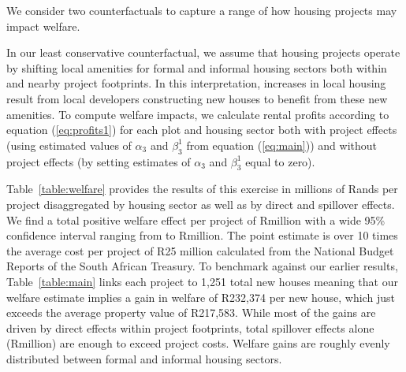\documentclass[12pt]{article}
\begin{document}
We consider two counterfactuals to capture a range of how housing projects may impact welfare.  

In our least conservative counterfactual, we assume that housing projects operate by shifting local amenities for formal and informal housing sectors both within and nearby project footprints.  In this interpretation, increases in local housing result from local developers constructing new houses to benefit from these new amenities.  To compute welfare impacts, we calculate rental profits according to equation (\ref{eq:profits1}) for each plot and housing sector both with project effects (using estimated values of $\alpha_3$ and $\beta_3^{1}$ from equation (\ref{eq:main})) and without project effects (by setting estimates of $\alpha_3$ and $\beta_3^{1}$ equal to zero).  

Table~\ref{table:welfare} provides the results of this exercise in millions of Rands per project disaggregated by housing sector as well as by direct and spillover effects.  We find a total positive welfare effect per project of Rmillion with a wide 95\% confidence interval ranging from to Rmillion.  The point estimate is over 10 times the average cost per project of R25 million calculated from the National Budget Reports of the South African Treasury. To benchmark against our earlier results, Table~\ref{table:main} links each project to 1,251 total new houses meaning that our welfare estimate implies a gain in welfare of R232,374 per new house, which just exceeds the average property value of R217,583.  While most of the gains are driven by direct effects within project footprints, total spillover effects alone (Rmillion) are enough to exceed project costs.  Welfare gains are roughly evenly distributed between formal and informal housing sectors.  
\end{document}
